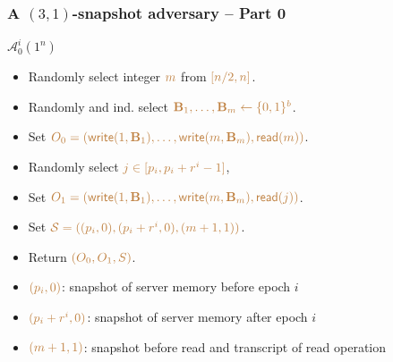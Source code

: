 \documentclass[]{beamer}
\newcommand{\zu}{\{0,1\}}
\newcommand{\from}{\leftarrow}
\newcommand{\calA}{\mathcal{A}}
\newcommand{\calS}{\mathcal{S}}
\newcommand{\re}{\mathsf{read}}
\newcommand{\wri}{\mathsf{write}}
\newcommand{\bB}{\mathbf{B}}
\begin{document}
\begin{frame}
\frametitle{A $(3,1)$-snapshot adversary -- Part 0}

\begin{block}{$\calA_0^i(1^n)$}
\begin{itemize}
\color{teal}
   \item Randomly select integer $\color{brown}m$ from $\color{brown}[n/2,n]$.
   \item Randomly and ind. select $\color{brown}\bB_1,\ldots,\bB_m\from\zu^b$.
   \item Set $\color{brown}O_0=(\wri(1,\bB_1),\ldots,\wri(m,\bB_m),\re(m))$.
   \item Randomly select $\color{brown}j\in [p_i,p_i + r^i - 1]$,
   \item Set $\color{brown}O_1=(\wri(1,\bB_1),\ldots,\wri(m,\bB_m),\re(j))$.
   \item Set $\color{brown}\calS=((p_i,0),(p_i+r^i,0),(m+1,1))$.
   \item Return $\color{brown}(O_0,O_1,S)$.
\end{itemize}
\end{block}
\pause

\begin{itemize}[<+->]
\item $\color{brown}(p_i,0)$: 
{\color{magenta} snapshot} of server memory before epoch $i$ 
\item $\color{brown}(p_i+r^i,0)$: 
{\color{magenta} snapshot} of server memory after epoch $i$ 
\item $\color{brown}(m+1,1)$: 
{\color{magenta} snapshot} before read and {\color{magenta} transcript}  of read operation
\end{itemize}
\end{frame}
\end{document}
